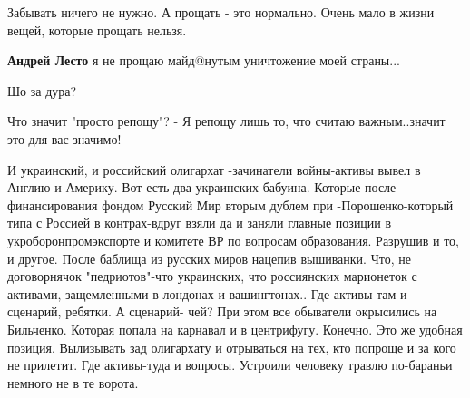 \begin{itemize}
 
Забывать ничего не нужно.
А прощать - это нормально. Очень мало в жизни вещей, которые прощать нельзя.

\begin{itemize} %
 
\textbf{Андрей Лесто} я не прощаю майд@нутым уничтожение моей страны...

 
Шо за дура?
\end{itemize} %

 
Что значит "просто репощу"? - Я репощу лишь то, что считаю важным..значит это для вас значимо!

 

И украинский, и российский олигархат -зачинатели войны-активы вывел в Англию и
Америку. Вот есть два украинских бабуина. Которые после финансирования фондом
Русский Мир вторым дублем при -Порошенко-который типа с Россией в контрах-вдруг
взяли да и заняли главные позиции в укроборонпромэкспорте и комитете ВР по
вопросам образования. Разрушив и то, и другое. После баблища из русских миров
нацепив вышиванки. Что, не договорнячок "педриотов"-что украинских, что
россиянских марионеток с активами, защемленными в лондонах и вашингтонах.. Где
активы-там и сценарий, ребятки. А сценарий- чей? При этом все обыватели
окрысились на Бильченко. Которая попала на карнавал и в центрифугу. Конечно.
Это же удобная позиция. Вылизывать зад олигархату и отрываться на тех, кто
попроще и за кого не прилетит. Где активы-туда и вопросы. Устроили человеку
травлю по-бараньи немного не в те ворота.


\end{itemize}
